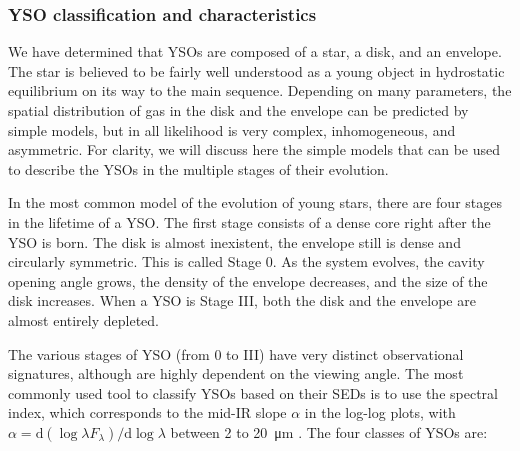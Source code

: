 



\subsubsection{YSO classification and characteristics}

We have determined that YSOs are composed of a star, a disk, and an envelope. The star is believed to be fairly well understood as a young object in hydrostatic equilibrium on its way to the main sequence. Depending on many parameters, the spatial distribution of gas in the disk and the envelope can be predicted by simple models, but in all likelihood is very complex, inhomogeneous, and asymmetric. 
For clarity, we will discuss here the simple models that can be used to describe the YSOs in the multiple stages of their evolution.

In the most common model of the evolution of young stars, there are four stages in the lifetime of a YSO. The first stage consists of a dense core right after the YSO is born. The disk is almost inexistent, the envelope still is dense and circularly symmetric. This is called Stage 0. As the system evolves, the cavity opening angle grows, the density of the envelope decreases, and the size of the disk increases. When a YSO is Stage III, both the disk and the envelope are almost entirely depleted.

The various stages of YSO (from 0 to III) have very distinct observational signatures, although are highly dependent on the viewing angle. The most commonly used tool to classify YSOs based on their SEDs is to use the spectral index, which corresponds to the mid-IR slope $\alpha$ in the log-log plots, with $\alpha = \textrm{d}(\log\lambda F_\lambda)/\textrm{d}\log\lambda$ between 2 to \SI{20}{\micro\meter} \citep{McKee:2007bd}. The four classes of YSOs are:



